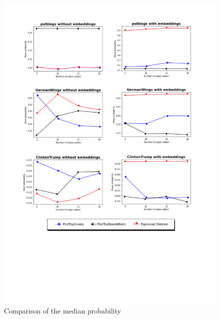 \begin{figure}[!htbp]
	\begin{center}
	\advance\leftskip-1.5cm
	\captionsetup{justification=centering,margin=2cm}
	\includegraphics[width=1.2\textwidth]{Figures/m2}
	\caption{Comparison of the median probability}
	\label{m1}
	\end{center}
\end{figure}

\clearpage

